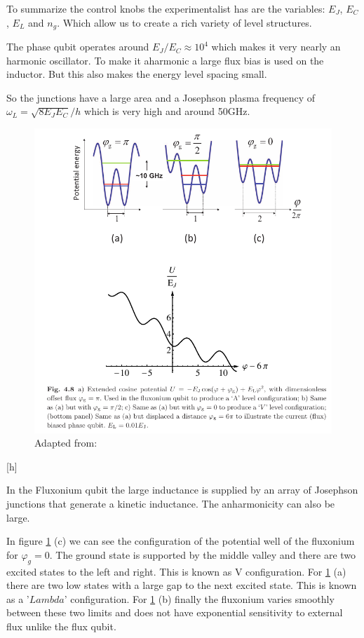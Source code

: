\documentclass[12pt]{article}
\numberwithin{equation}{subsection}
\newcommand\page[1]{
{
}
}
\begin{document}
To summarize the control knobs the experimentalist has are the variables: $E_J$, $E_C$, $E_L$ and $n_g$. Which allow us to create a rich variety of level structures.

The phase qubit operates around $E_J/E_C \approx 10^4$ which makes it very nearly an harmonic oscillator. 
To make it aharmonic a large flux bias is used on the inductor. But this also makes the energy level spacing small. 
\page{58}
So the junctions have a large area and a Josephson plasma frequency of $\omega_L = \sqrt {8E_JE_C}/h $ which is very high and around 50GHz.

\begin{figure}[h]
\includegraphics[scale=0.5]{images/58-fluxonium-wells.png}
\caption{Adapted from: \cite{Girvin2015CircuitQS}}
\label{58-fluxonium-wells}
\end{figure}[h]

\page{59}
In the Fluxonium qubit the large inductance is supplied by an array of Josephson junctions that generate a kinetic inductance. The anharmonicity can also be large.


In figure \ref{58-fluxonium-wells} (c) we can see the configuration of the potential well of the fluxonium for $\varphi_g = 0$. The ground state is supported by the middle valley and there are two excited states to the left and right. This is known as V configuration.
For \ref{58-fluxonium-wells} (a) there are two low states with a large gap to the next excited state. This is known as a '$Lambda$' configuration.
For \ref{58-fluxonium-wells} (b) finally the fluxonium varies smoothly between these two limits and does not have exponential sensitivity to external flux unlike the flux qubit.
\end{document}
